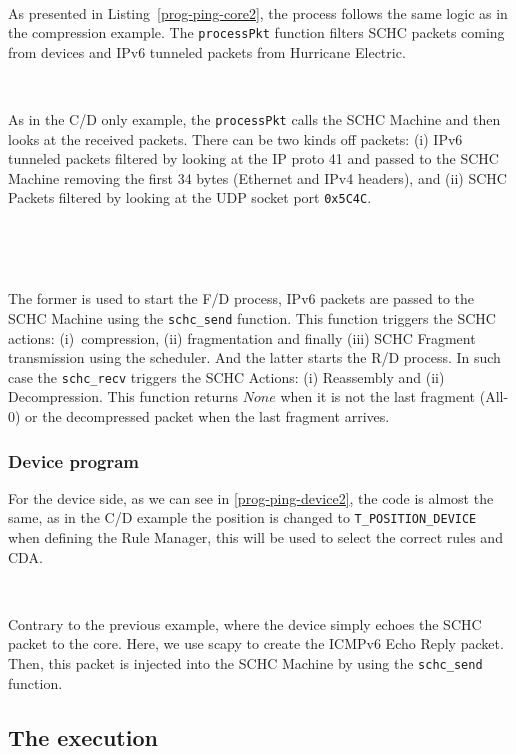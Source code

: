\documentclass[onecolumn,12pt]{book}
\newcounter{c}
\begin{document}
~

As presented in Listing~\vref{prog-ping-core2}, the process follows the same logic as in the compression example. 
The \texttt{processPkt} function filters SCHC packets coming from devices and IPv6 tunneled packets from Hurricane Electric. 

~

As in the C/D only example, the \texttt{processPkt} calls the SCHC Machine and then looks at the received packets. 
There can be two kinds off packets: (i) IPv6 tunneled packets filtered by looking at the IP proto 41 and passed to the SCHC Machine removing the first 34 bytes (Ethernet and IPv4 headers), and (ii) SCHC Packets filtered by looking at the UDP socket port \texttt{0x5C4C}.

~

~

The former is used to start the F/D process, IPv6 packets are passed to the SCHC Machine using the \texttt{schc\_send} function. 
This function triggers the SCHC actions: (i)~compression, (ii) fragmentation and finally (iii) SCHC Fragment transmission using the scheduler.
And the latter starts the R/D process. 
In such case the \texttt{schc\_recv} triggers the SCHC Actions: (i) Reassembly and (ii) Decompression. This function returns $None$ when it is not the last fragment (All-0) or the decompressed packet when the last fragment arrives.

\subsubsection{Device program}

For the device side, as we can see in \vref{prog-ping-device2}, the code is almost the same, as in the C/D example the position is changed to \texttt{T\_POSITION\_DEVICE} when defining the Rule Manager, this will be used to select the correct rules and CDA.

~

Contrary to the previous example, where the device simply echoes the SCHC packet to the core. 
Here, we use scapy to create the ICMPv6 Echo Reply packet.
Then, this packet is injected into the SCHC Machine by using the \texttt{schc\_send} function.




\subsection{The execution}
\end{document}
